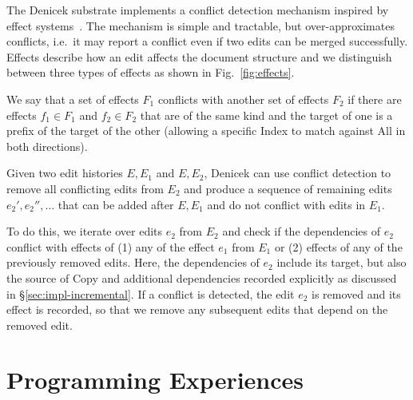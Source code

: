 \documentclass[sigconf,anonymous,screen]{acmart}
\newcommand{\ident}[1]{{\sffamily #1}}
\newcommand{\note}[1]{\textcolor{red}{#1}}
\begin{document}
The Denicek substrate implements a conflict detection mechanism inspired by effect
systems~\cite{lucassen-1988-effects}. The mechanism is simple and tractable, but over-approximates
conflicts, i.e.~it may report a conflict even if two edits can be merged successfully.
Effects describe how an edit affects the document structure
and we distinguish between three types of effects as shown in Fig.~\ref{fig:effects}.

We say that a set of effects $F_1$ conflicts with another set of effects $F_2$ if there
are effects $f_1\in F_1$ and $f_2\in F_2$ that are of the same kind and the target
of one is a prefix of the target of the other (allowing a specific \ident{Index} to
match against \ident{All} in both directions).

Given two edit histories $E, E_1$ and $E, E_2$, Denicek can use conflict detection to remove
all conflicting edits from $E_2$ and produce a sequence of remaining edits $e_2', e_2'', \ldots$
that can be added after $E, E_1$ and do not conflict with edits in $E_1$.

To do this, we iterate over edits $e_2$ from $E_2$ and check if the dependencies of $e_2$
conflict with effects of (1) any of the effect $e_1$ from $E_1$ or (2) effects of any of the
previously removed edits. Here, the dependencies of $e_2$ include its target, but also the source
of \ident{Copy} and additional dependencies recorded explicitly as discussed in
\S\ref{sec:impl-incremental}. If a conflict is detected, the edit $e_2$ is removed and its effect
is recorded, so that we remove any subsequent edits that depend on the removed edit.



\section{Programming Experiences}
\label{sec:impl}
\end{document}
